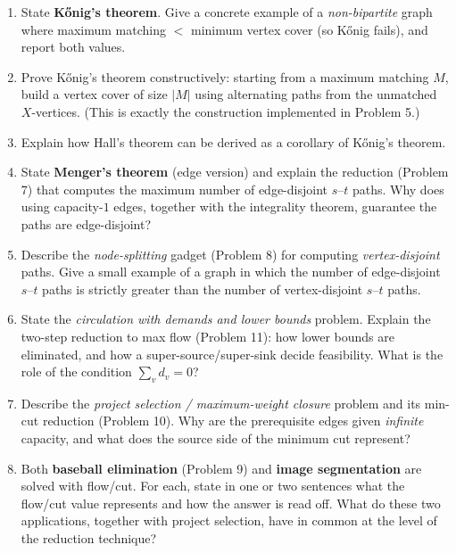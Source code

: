 \documentclass[11pt]{article}
\begin{document}
\begin{enumerate}[label=\textbf{A\arabic*.}, leftmargin=2.2em]
\item State \textbf{K\H{o}nig's theorem}. Give a concrete example of a
\emph{non-bipartite} graph where maximum matching $<$ minimum vertex cover
(so K\H{o}nig fails), and report both values.

\item Prove K\H{o}nig's theorem constructively: starting from a maximum matching
$M$, build a vertex cover of size $|M|$ using alternating paths from the
unmatched $X$-vertices. (This is exactly the construction implemented in
Problem 5.)

\item Explain how Hall's theorem can be derived as a corollary of K\H{o}nig's
theorem.

\item State \textbf{Menger's theorem} (edge version) and explain the reduction
(Problem 7) that computes the maximum number of edge-disjoint $s$--$t$ paths.
Why does using capacity-$1$ edges, together with the integrality theorem,
guarantee the paths are edge-disjoint?

\item Describe the \emph{node-splitting} gadget (Problem 8) for computing
\emph{vertex-disjoint} paths. Give a small example of a graph in which the number
of edge-disjoint $s$--$t$ paths is strictly greater than the number of
vertex-disjoint $s$--$t$ paths.

\item State the \emph{circulation with demands and lower bounds} problem. Explain
the two-step reduction to max flow (Problem 11): how lower bounds are eliminated,
and how a super-source/super-sink decide feasibility. What is the role of the
condition $\sum_v d_v = 0$?

\item Describe the \emph{project selection / maximum-weight closure} problem and
its min-cut reduction (Problem 10). Why are the prerequisite edges given
\emph{infinite} capacity, and what does the source side of the minimum cut
represent?

\item Both \textbf{baseball elimination} (Problem 9) and \textbf{image
segmentation} are solved with flow/cut. For each, state in one or two sentences
what the flow/cut value represents and how the answer is read off. What do these
two applications, together with project selection, have in common at the level of
the reduction technique?

\end{enumerate}
\end{document}
